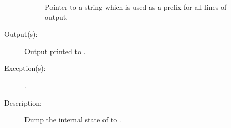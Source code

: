 \begin{description}
\begin{description}
\begin{description}
			Pointer to a string which is used as a prefix for all
			lines of output.
		\end{description}
	\item[Output(s): ]
		Output printed to .
	\item[Exception(s): ]
		\begin{description}\item[]
		\item[.]
		\end{description}
	\item[Description: ]
		Dump the internal state of  to .
	\end{description}
\end{description}
